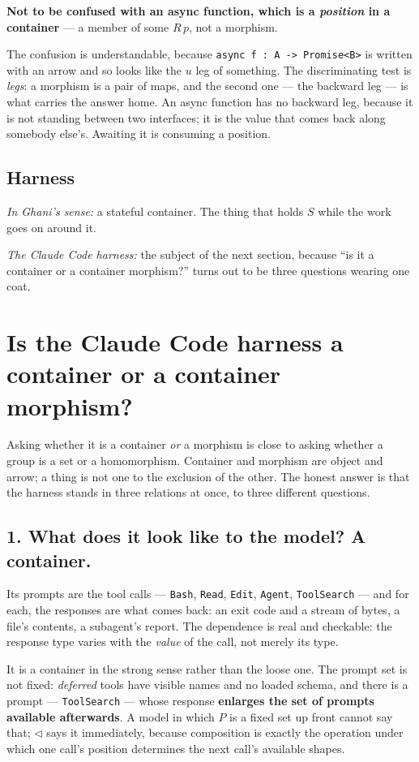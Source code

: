 \documentclass[11pt,a4paper]{article}
\newcommand{\code}[1]{\texttt{\small #1}}
\newcommand{\comp}{\mathbin{\triangleleft}}
\begin{document}
\medskip
\noindent\textbf{Not to be confused with an async function, which is a \emph{position} in a
container} --- a member of some $R\,p$, not a morphism.

The confusion is understandable, because \code{async f : A -> Promise<B>} is written with an arrow
and so looks like the $u$ leg of something. The discriminating test is \emph{legs}: a morphism is a
pair of maps, and the second one --- the backward leg --- is what carries the answer home. An async
function has no backward leg, because it is not standing between two interfaces; it is the value
that comes back along somebody else's. Awaiting it is consuming a position.

\subsection{Harness}

\emph{In Ghani's sense:} a stateful container. The thing that holds $S$ while the work goes on
around it.

\emph{The Claude Code harness:} the subject of the next section, because ``is it a container or a
container morphism?'' turns out to be three questions wearing one coat.

\section{Is the Claude Code harness a container or a container morphism?}

Asking whether it is a container \emph{or} a morphism is close to asking whether a group is a set
or a homomorphism. Container and morphism are object and arrow; a thing is not one to the exclusion
of the other. The honest answer is that the harness stands in three relations at once, to three
different questions.

\subsection*{1. What does it look like to the model? A container.}

Its prompts are the tool calls --- \code{Bash}, \code{Read}, \code{Edit}, \code{Agent},
\code{ToolSearch} --- and for each, the responses are what comes back: an exit code and a stream of
bytes, a file's contents, a subagent's report. The dependence is real and checkable: the response
type varies with the \emph{value} of the call, not merely its type.

It is a container in the strong sense rather than the loose one. The prompt set is not fixed:
\emph{deferred} tools have visible names and no loaded schema, and there is a prompt ---
\code{ToolSearch} --- whose response \textbf{enlarges the set of prompts available afterwards}. A
model in which $P$ is a fixed set up front cannot say that; $\comp$ says it immediately, because
composition is exactly the operation under which one call's position determines the next call's
available shapes.
\end{document}
